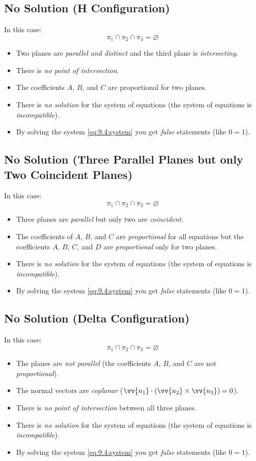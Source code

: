 \subsection{No Solution (H Configuration)}
	In this case:
	\[\pi_1 \cap \pi_2 \cap \pi_3 = \varnothing\]
	\begin{itemize}
		\item Two planes are \emph{parallel and distinct} and the third plane is \emph{intersecting}.
		\item There is \emph{no point of intersection}.
		\item The coefficients $A$, $B$, and $C$ are proportional for two planes.
		\item There is \emph{no solution} for the system of equations (the system of equations is \emph{incompatible}).
		\item By solving the system \eqref{eq:9.4:system} you get \emph{false} statements (like $0 = 1$).
	\end{itemize}
\subsection{No Solution (Three Parallel Planes but only Two Coincident Planes)}
	In this case:
	\[\pi_1 \cap \pi_2 \cap \pi_3 = \varnothing\]
	\begin{itemize}
		\item Three planes are \emph{parallel} but only two are \emph{coincident}.
		\item The coefficients of $A$, $B$, and $C$ are \emph{proportional} for all equations but the coefficients $A$, $B$, $C$, and $D$ are \emph{proportional} only for two planes.
		\item There is \emph{no solution} for the system of equations (the system of equations is \emph{incompatible}).
		\item By solving the system \eqref{eq:9.4:system} you get \emph{false} statements (like $0 = 1$).
	\end{itemize}
\subsection{No Solution (Delta Configuration)}
	In this case:
	\[\pi_1 \cap \pi_2 \cap \pi_3 = \varnothing\]
	\begin{itemize}
		\item The planes are \emph{not parallel} (the coefficients $A$, $B$, and $C$ are not \emph{proportional}).
		\item The normal vectors are \emph{coplanar} ($\vv{n_1} \cdot (\vv{n_2} \times \vv{n_3}) = 0$).
		\item There is \emph{no point of intersection} between all three planes.
		\item There is \emph{no solution} for the system of equations (the system of equations is \emph{incompatible}).
		\item By solving the system \eqref{eq:9.4:system} you get \emph{false} statements (like $0 = 1$).
	\end{itemize}
